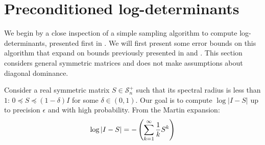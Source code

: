 
\section{Preconditioned log-determinants\label{sec:Preconditioned-log-determinants}}

We begin by a close inspection of a simple sampling algorithm to compute
log-determinants, presented first in \cite{Barry1999}. We will first
present some error bounds on this algorithm that expand on bounds
previously presented in \cite{Bai1996} and \cite{Barry1999}. This
section considers general symmetric matrices and does not make assumptions
about diagonal dominance.

Consider a real symmetric matrix $S\in\mathcal{S}_{n}^{+}$ such that
its spectral radius is less than $1$: $0\preceq S\preceq\left(1-\delta\right)I$
for some $\delta\in\left(0,1\right)$. Our goal is to compute $\log\left|I-S\right|$
up to precision $\epsilon$ and with high probability. From the Martin
expansion: 
\begin{equation}
\log\left|I-S\right|=-\Tr\left(\sum_{k=1}^{\infty}\frac{1}{k}S^{k}\right)\label{eq:martin}
\end{equation}


